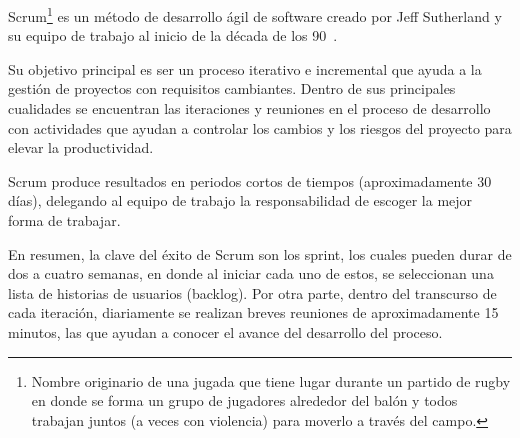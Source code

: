 Scrum\footnote{Nombre originario  de una jugada que tiene lugar durante un partido de rugby en donde se forma un grupo de jugadores alrededor del balón y todos trabajan juntos (a veces con violencia) para moverlo a través del campo. } es un método de desarrollo ágil de software creado por Jeff Sutherland y su equipo de trabajo al inicio de la década de los 90~\cite{7}.

Su objetivo principal es ser un proceso iterativo e incremental que ayuda a la gestión de proyectos con requisitos cambiantes. Dentro de sus principales cualidades se encuentran las iteraciones y reuniones en el proceso de desarrollo con actividades que ayudan a controlar los cambios y los riesgos del proyecto para elevar la productividad.

Scrum produce resultados en periodos cortos de tiempos (aproximadamente 30 días), delegando al equipo de trabajo la responsabilidad de escoger la mejor forma de trabajar.

En resumen, la clave del éxito de Scrum son los sprint, los cuales pueden durar de dos a cuatro semanas, en donde al iniciar cada uno de estos, se seleccionan una lista de historias de usuarios (backlog). Por otra parte, dentro del transcurso de cada iteración, diariamente se realizan breves reuniones de aproximadamente 15 minutos, las que ayudan a conocer el avance del desarrollo del proceso.





